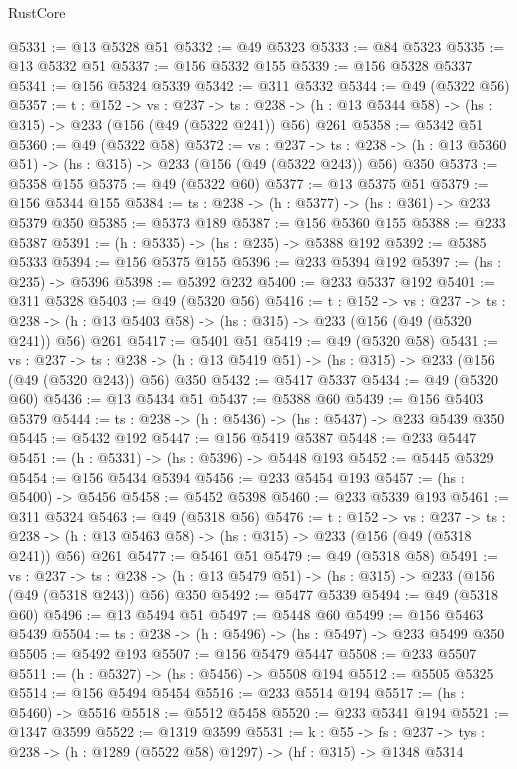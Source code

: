 \begin{lexlean}{RustCore}
\begin{coremodule}
@5331 := @13 @5328 @51
@5332 := @49 @5323
@5333 := @84 @5323
@5335 := @13 @5332 @51
@5337 := @156 @5332 @155
@5339 := @156 @5328 @5337
@5341 := @156 @5324 @5339
@5342 := @311 @5332
@5344 := @49 (@5322 @56)
@5357 := {t : @152} ->
  {vs : @237} ->
  {ts : @238} -> (h : @13 @5344 @58) -> (hs : @315) -> @233 (@156 (@49 (@5322 @241)) @56) @261
@5358 := @5342 @51
@5360 := @49 (@5322 @58)
@5372 := {vs : @237} ->
  {ts : @238} -> (h : @13 @5360 @51) -> (hs : @315) -> @233 (@156 (@49 (@5322 @243)) @56) @350
@5373 := @5358 @155
@5375 := @49 (@5322 @60)
@5377 := @13 @5375 @51
@5379 := @156 @5344 @155
@5384 := {ts : @238} -> (h : @5377) -> (hs : @361) -> @233 @5379 @350
@5385 := @5373 @189
@5387 := @156 @5360 @155
@5388 := @233 @5387
@5391 := (h : @5335) -> (hs : @235) -> @5388 @192
@5392 := @5385 @5333
@5394 := @156 @5375 @155
@5396 := @233 @5394 @192
@5397 := (hs : @235) -> @5396
@5398 := @5392 @232
@5400 := @233 @5337 @192
@5401 := @311 @5328
@5403 := @49 (@5320 @56)
@5416 := {t : @152} ->
  {vs : @237} ->
  {ts : @238} -> (h : @13 @5403 @58) -> (hs : @315) -> @233 (@156 (@49 (@5320 @241)) @56) @261
@5417 := @5401 @51
@5419 := @49 (@5320 @58)
@5431 := {vs : @237} ->
  {ts : @238} -> (h : @13 @5419 @51) -> (hs : @315) -> @233 (@156 (@49 (@5320 @243)) @56) @350
@5432 := @5417 @5337
@5434 := @49 (@5320 @60)
@5436 := @13 @5434 @51
@5437 := @5388 @60
@5439 := @156 @5403 @5379
@5444 := {ts : @238} -> (h : @5436) -> (hs : @5437) -> @233 @5439 @350
@5445 := @5432 @192
@5447 := @156 @5419 @5387
@5448 := @233 @5447
@5451 := (h : @5331) -> (hs : @5396) -> @5448 @193
@5452 := @5445 @5329
@5454 := @156 @5434 @5394
@5456 := @233 @5454 @193
@5457 := (hs : @5400) -> @5456
@5458 := @5452 @5398
@5460 := @233 @5339 @193
@5461 := @311 @5324
@5463 := @49 (@5318 @56)
@5476 := {t : @152} ->
  {vs : @237} ->
  {ts : @238} -> (h : @13 @5463 @58) -> (hs : @315) -> @233 (@156 (@49 (@5318 @241)) @56) @261
@5477 := @5461 @51
@5479 := @49 (@5318 @58)
@5491 := {vs : @237} ->
  {ts : @238} -> (h : @13 @5479 @51) -> (hs : @315) -> @233 (@156 (@49 (@5318 @243)) @56) @350
@5492 := @5477 @5339
@5494 := @49 (@5318 @60)
@5496 := @13 @5494 @51
@5497 := @5448 @60
@5499 := @156 @5463 @5439
@5504 := {ts : @238} -> (h : @5496) -> (hs : @5497) -> @233 @5499 @350
@5505 := @5492 @193
@5507 := @156 @5479 @5447
@5508 := @233 @5507
@5511 := (h : @5327) -> (hs : @5456) -> @5508 @194
@5512 := @5505 @5325
@5514 := @156 @5494 @5454
@5516 := @233 @5514 @194
@5517 := (hs : @5460) -> @5516
@5518 := @5512 @5458
@5520 := @233 @5341 @194
@5521 := @1347 @3599
@5522 := @1319 @3599
@5531 := {k : @55} ->
  {fs : @237} -> {tys : @238} -> (h : @1289 (@5522 @58) @1297) -> (hf : @315) -> @1348 @5314

\end{coremodule}
\end{lexlean}

